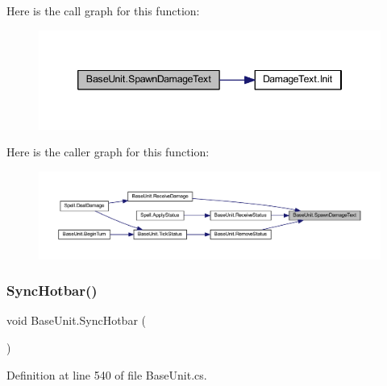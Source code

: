 Here is the call graph for this function\+:
\nopagebreak
\begin{figure}[H]
\begin{center}
\leavevmode
\includegraphics[width=346pt]{class_base_unit_aacee7b4acfdd28621f3a1b66bf8d646a_cgraph}
\end{center}
\end{figure}
Here is the caller graph for this function\+:
\nopagebreak
\begin{figure}[H]
\begin{center}
\leavevmode
\includegraphics[width=350pt]{class_base_unit_aacee7b4acfdd28621f3a1b66bf8d646a_icgraph}
\end{center}
\end{figure}
\mbox{\label{class_base_unit_a15ea3ea70ab13cf8aa582b848cd0531b}} 
\subsubsection{\texorpdfstring{SyncHotbar()}{SyncHotbar()}}
{\footnotesize\ttfamily void Base\+Unit.\+Sync\+Hotbar (\begin{DoxyParamCaption}{ }\end{DoxyParamCaption})}



Definition at line 540 of file Base\+Unit.\+cs.

